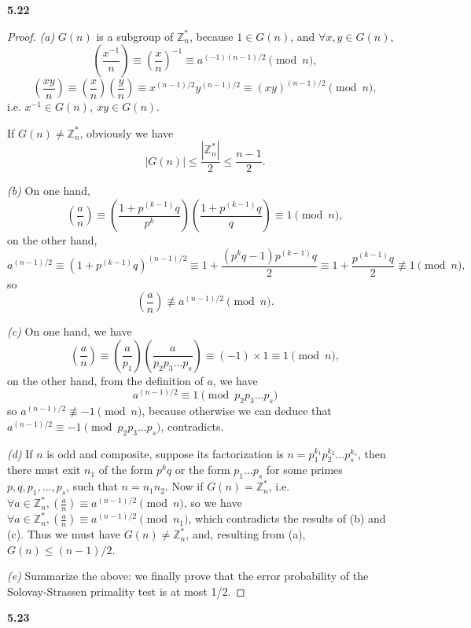 \documentclass[12pt,a4paper]{article}
\theoremstyle{solution}
\begin{document}
\textbf{5.22}

\begin{proof}
{\em (a) }$G(n)$ is a subgroup of $\mathbb{Z}_n^*$, because $1\in G(n)$, and $\forall x,y \in G(n),$
$$
\left( \frac{x^{-1}}{n}\right) \equiv \left( \frac{x}{n}\right)^{-1} \equiv a^{(-1)(n-1)/2} \pmod{n},
$$
$$
\left( \frac{xy}{n}\right) \equiv \left( \frac{x}{n}\right) \left( \frac{y}{n}\right) \equiv x^{(n-1)/2} y^{(n-1)/2} \equiv (xy)^{(n-1)/2} \pmod{n},
$$
i.e. $x^{-1}\in G(n),~xy\in G(n)$.

If $G(n)\neq \mathbb{Z}_n^*$, obviously we have
$$
|G(n)| \leq \frac{|\mathbb{Z}_n^*|}{2}\leq \frac{n-1}{2}.
$$

{\em (b) }On one hand,
$$
\left( \frac{a}{n}\right) \equiv \left( \frac{1+p^{(k-1)}q}{p^k}\right) \left( \frac{1+p^{(k-1)}q}{q}\right) \equiv 1 \pmod{n},
$$
on the other hand,
$$
a^{(n-1)/2} \equiv (1+p^{(k-1)}q)^{(n-1)/2} \equiv 1+\frac{(p^kq-1)p^{(k-1)}q}{2} \equiv 1+\frac{p^{(k-1)}q}{2} \nequiv 1 \pmod{n},
$$
so
$$
\left( \frac{a}{n}\right) \nequiv a^{(n-1)/2} \pmod{n}.
$$

{\em (c) }On one hand, we have
$$
\left( \frac{a}{n}\right) \equiv \left( \frac{a}{p_1}\right) \left( \frac{a}{p_2 p_3 \ldots p_s}\right) \equiv (-1)\times 1\equiv 1 \pmod{n},
$$
on the other hand, from the definition of $a$, we have
$$
a^{(n-1)/2} \equiv 1 \pmod{p_2 p_3 \ldots p_s}
$$
so $a^{(n-1)/2} \nequiv -1 \pmod{n}$, because otherwise we can deduce that $a^{(n-1)/2} \equiv -1 \pmod{p_2 p_3 \ldots p_s}$, contradicts.

{\em (d) }If $n$ is odd and composite, suppose its factorization is $n=p_1^{k_1}p_2^{k_2}\ldots p_s^{k_s}$, then there must exit $n_1$ of the form $p^k q$ or the form $p_1 \ldots p_s$ for some primes $p,q,p_1, \ldots, p_s$, such that $n=n_1 n_2$. Now if $G(n)=\mathbb{Z}_n^*$, i.e. $\forall a \in \mathbb{Z}_n^*,\left( \frac{a}{n}\right) \equiv a^{(n-1)/2} \pmod{n}$, so we have $\forall a \in \mathbb{Z}_n^*,\left( \frac{a}{n}\right) \equiv a^{(n-1)/2} \pmod{n_1}$, which contradicts the results of (b) and (c). Thus we must have $G(n)\neq \mathbb{Z}_n^*$, and, resulting from (a), $G(n)\leq (n-1)/2$.

{\em (e) } Summarize the above: we finally prove that the error probability of the Solovay-Strassen primality test is at most 1/2.
\end{proof}


\textbf{5.23}
\end{document}
